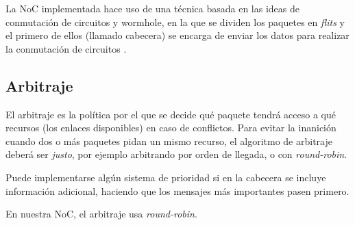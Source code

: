 \begin{recuadronoc}
La NoC implementada hace uso de una técnica basada en las ideas de conmutación de circuitos y wormhole, en la que se dividen los paquetes en \textit{flits} y el primero de ellos (llamado cabecera) se encarga de enviar los datos para realizar la conmutación de circuitos \cite{SafeiPCS, YalamanchiliPCS}.
\end{recuadronoc}

\subsection{Arbitraje}

El arbitraje es la política por el que se decide qué paquete tendrá acceso a qué recursos (los enlaces disponibles) en caso de conflictos. Para evitar la inanición cuando dos o más paquetes pidan un mismo recurso, el algoritmo de arbitraje deberá ser \textit{justo}, por ejemplo arbitrando por orden de llegada, o con \textit{round-robin}.

Puede implementarse algún sistema de prioridad si en la cabecera se incluye información adicional, haciendo que los mensajes más importantes pasen primero.

\begin{recuadronoc}
    En nuestra NoC, el arbitraje usa \textit{round-robin}.
\end{recuadronoc}
